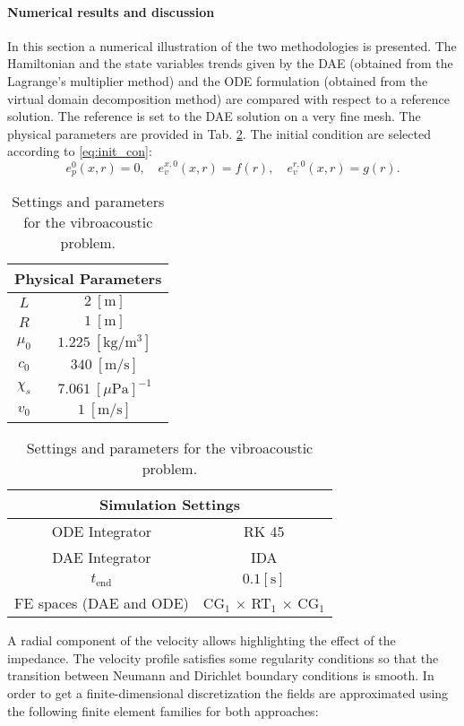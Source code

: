 \paragraph{Numerical results and discussion}
In this section a numerical illustration of the two methodologies is presented. The Hamiltonian and the state variables trends given by the DAE (obtained from the Lagrange's multiplier method) and the ODE formulation (obtained from the virtual domain decomposition method) are compared with respect to a reference solution. The reference is set to the DAE solution on a very fine mesh. The physical parameters are provided in Tab. \ref{tab:parWaves}. 
The initial condition are selected according to \eqref{eq:init_con}:
\begin{equation*}
e_p^0(x, r) = 0 , \quad e_v^{x, 0}(x, r) = f(r), \quad e_v^{r, 0}(x, r) = g(r). 
\end{equation*}

\begin{table}[t]
	\centering
	\begin{tabular}{|c|c|}
		\hline 
		\multicolumn{2}{|c|}{Physical Parameters} \\ 
		\hline 
		$L$ & $2\ [\textrm{m}]$ \\ 
		$R$ & $1\ [\textrm{m}]$ \\
		$\mu_0$ & $1.225\ [\textrm{kg}/\textrm{m}^3]$ \\ 
		$c_0$ & $340\ [\textrm{m/s}]$ \\
		$\chi_s$ & $7.061 \ [\mu\textrm{Pa}]^{-1}$ \\ 
		$v_0$ & $1\ [\textrm{m/s}]$ \\ 
		\hline 
	\end{tabular} \hspace{.5cm}
	\begin{tabular}{|c|c|}
		\hline 
		\multicolumn{2}{|c|}{Simulation Settings} \\ 
		\hline 
		ODE Integrator & RK 45\\
		DAE Integrator & IDA\\ 
		$t_{\text{end}}$& $0.1  [\textrm{s}]$ \\ 
		FE spaces (DAE and ODE) & CG$_1$ $\times$ RT$_1$ $\times$ CG$_1$ \\
		\hline 
	\end{tabular} 
	\vspace{1mm}
	\caption{Settings and parameters for the vibroacoustic problem.}
	\label{tab:parWaves}
\end{table}

A radial component of the velocity allows highlighting the effect of the impedance. The velocity profile satisfies some regularity conditions so that the transition between Neumann and Dirichlet boundary conditions is smooth. In order to get a finite-dimensional discretization the fields are approximated using the following finite element families for both approaches:

